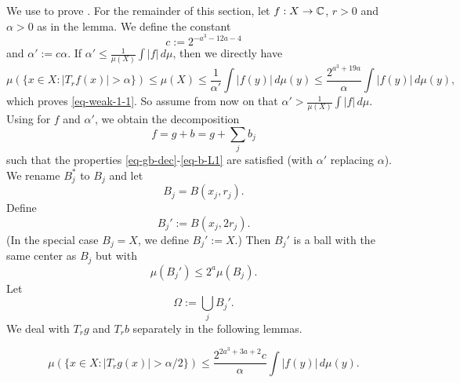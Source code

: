 We use  to prove . For the remainder of this section, let $f:X\to{\mathbb{C}}$, $r>0$ and $\alpha>0$ as in the lemma.
We define the constant
\begin{equation} \label{weak-1-1-proof-cz-const}
    c:= 2^{-a^3-12a-4}
\end{equation}
and $\alpha' := c\alpha$. If $\alpha'\le\frac{1}{\mu(X)}\int |f|\,d\mu$, then we directly have
\begin{equation*}
    \mu\left(\{x\in X: |T_r f(x)|>\alpha\}\right)\le \mu(X) \le \frac{1}{\alpha'} \int |f(y)|\, d\mu(y)
    \le \frac{2^{a^3 + 19a}}{\alpha} \int |f(y)|\, d\mu(y),
\end{equation*}
which proves \eqref{eq-weak-1-1}.
So assume from now on that $\alpha'>\frac{1}{\mu(X)}\int |f|\,d\mu$.
Using  for $f$ and $\alpha'$, we obtain the decomposition
\begin{equation*}
    f=g+b=g+\sum_j b_j
\end{equation*}
such that the properties \eqref{eq-gb-dec}-\eqref{eq-b-L1} are satisfied (with $\alpha'$ replacing $\alpha$). We rename $B_j^*$ to $B_j$ and let
\begin{equation}
    \label{eq-Ij-cj}
    B_j=B(x_j, r_j).
\end{equation}
Define
\begin{equation}
    \label{eq-Ij*}
    B_j':=B(x_j, 2r_j).
\end{equation}
(In the special case $B_j=X$, we define $B_j':=X$.)
Then $B_j'$ is a ball with the same center as $B_j$ but with
\begin{equation}
    \label{eq-Ij*-dim}
    \mu(B_j')\le 2^{a} \mu(B_j).
\end{equation}
Let
\begin{equation}
    \label{eq-omega}
    \Omega:=\bigcup_j B_j'.
\end{equation}
We deal with $T_rg$ and $T_rb$ separately in the following lemmas.

\begin{lemma}
    \label{estimate-good}
    \begin{equation*}
        \mu\left(\{x\in X: |T_r g(x)|>{\alpha}/2\}\right)
        \le \frac{2^{2a^3+3a+2}c}{\alpha} \int |f(y)|\, d\mu(y).
    \end{equation*}

\end{lemma}

